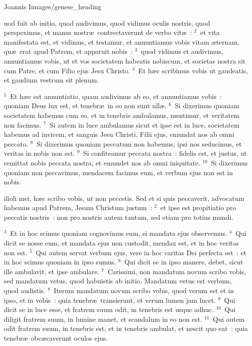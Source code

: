 {Joannis I}{images/genese_heading}


\bchapter
{}uod fuit ab initio, quod audivimus, quod vidimus oculis nostris, quod perspeximus, et manus nostr\ae\ contrectaverunt de verbo vit\ae~:
${}^{2}$~et vita manifestata est, et vidimus, et testamur, et annuntiamus vobis vitam \ae ternam, qu\ae\ erat apud Patrem, et apparuit nobis~:
${}^{3}$~quod vidimus et audivimus, annuntiamus vobis, ut et vos societatem habeatis nobiscum, et societas nostra sit cum Patre, et cum Filio ejus Jesu Christo.
${}^{4}$~Et h\ae c scribimus vobis ut gaudeatis, et gaudium vestrum sit plenum.


${}^{5}$~Et h\ae c est annuntiatio, quam audivimus ab eo, et annuntiamus vobis~: quoniam Deus lux est, et tenebr\ae\ in eo non sunt ull\ae .
${}^{6}$~Si dixerimus quoniam societatem habemus cum eo, et in tenebris ambulamus, mentimur, et veritatem non facimus.
${}^{7}$~Si autem in luce ambulamus sicut et ipse est in luce, societatem habemus ad invicem, et sanguis Jesu Christi, Filii ejus, emundat nos ab omni peccato.
${}^{8}$~Si dixerimus quoniam peccatum non habemus, ipsi nos seducimus, et veritas in nobis non est.
${}^{9}$~Si confiteamur peccata nostra~: fidelis est, et justus, ut remittat nobis peccata nostra, et emundet nos ab omni iniquitate.
${}^{10}$~Si dixerimus quoniam non peccavimus, mendacem facimus eum, et verbum ejus non est in nobis.

\bchapter
{}ilioli mei, h\ae c scribo vobis, ut non peccetis. Sed et si quis peccaverit, advocatum habemus apud Patrem, Jesum Christum justum~:
${}^{2}$~et ipse est propitiatio pro peccatis nostris~: non pro nostris autem tantum, sed etiam pro totius mundi.


${}^{3}$~Et in hoc scimus quoniam cognovimus eum, si mandata ejus observemus.
${}^{4}$~Qui dicit se nosse eum, et mandata ejus non custodit, mendax est, et in hoc veritas non est.
${}^{5}$~Qui autem servat verbum ejus, vere in hoc caritas Dei perfecta est~: et in hoc scimus quoniam in ipso sumus.
${}^{6}$~Qui dicit se in ipso manere, debet, sicut ille ambulavit, et ipse ambulare.
${}^{7}$~Carissimi, non mandatum novum scribo vobis, sed mandatum vetus, quod habuistis ab initio. Mandatum vetus est verbum, quod audistis.
${}^{8}$~Iterum mandatum novum scribo vobis, quod verum est et in ipso, et in vobis~: quia tenebr\ae\ transierunt, et verum lumen jam lucet.
${}^{9}$~Qui dicit se in luce esse, et fratrem suum odit, in tenebris est usque adhuc.
${}^{10}$~Qui diligit fratrem suum, in lumine manet, et scandalum in eo non est.
${}^{11}$~Qui autem odit fratrem suum, in tenebris est, et in tenebris ambulat, et nescit quo eat~: quia tenebr\ae\ obc\ae caverunt oculos ejus.


